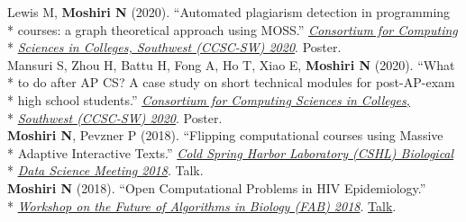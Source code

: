 \documentclass[margin,line]{res}
\begin{document}
\begin{resume}
\hspace*{4mm} Lewis M, \textbf{Moshiri N} (2020). ``Automated plagiarism detection in programming\\*
\hspace*{9mm} courses: a graph theoretical approach using MOSS.'' \href{http://ccsc.org/southwestern/2020/index.php}{\textit{Consortium for Computing}}\\*\vspace{2mm}
\hspace*{8mm} \href{http://ccsc.org/southwestern/2020/index.php}{\textit{Sciences in Colleges, Southwest (CCSC-SW) 2020}}. Poster.\\
\hspace*{4mm} Mansuri S, Zhou H, Battu H, Fong A, Ho T, Xiao E, \textbf{Moshiri N} (2020). ``What\\*
\hspace*{9mm} to do after AP CS? A case study on short technical modules for post-AP-exam\\*
\hspace*{9mm} high school students.'' \href{http://ccsc.org/southwestern/2020/index.php}{\textit{Consortium for Computing Sciences in Colleges,}}\\*\vspace{2mm}
\hspace*{8mm} \href{http://ccsc.org/southwestern/2020/index.php}{\textit{Southwest (CCSC-SW) 2020}}. Poster.\\
\hspace*{4mm} \textbf{Moshiri N}, Pevzner P (2018). ``Flipping computational courses using Massive\\*
\hspace*{9mm} Adaptive Interactive Texts.'' \href{http://meetings.cshl.edu/meetings.aspx?meet=DATA&year=18}{\textit{Cold Spring Harbor Laboratory (CSHL) Biological}}\\*\vspace{2mm}
\hspace*{8mm} \href{http://meetings.cshl.edu/meetings.aspx?meet=DATA&year=18}{\textit{Data Science Meeting 2018}}. Talk.\\
\hspace*{4mm} \textbf{Moshiri N} (2018). ``Open Computational Problems in HIV Epidemiology.''\\*\vspace{2mm}
\hspace*{8mm} \href{http://fab2018.cbd.cmu.edu/}{\textit{Workshop on the Future of Algorithms in Biology (FAB) 2018}}. \href{https://youtu.be/ENKBbV_30kk}{Talk}.\\

\end{resume}
\end{document}
